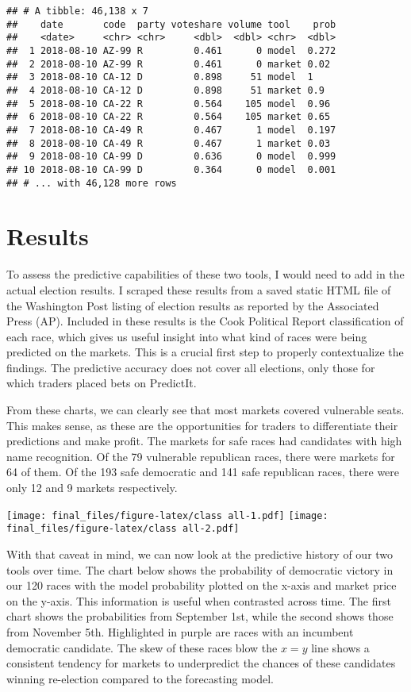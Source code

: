 \documentclass[]{article}
\begin{document}
\begin{verbatim}
## # A tibble: 46,138 x 7
##    date       code  party voteshare volume tool    prob
##    <date>     <chr> <chr>     <dbl>  <dbl> <chr>  <dbl>
##  1 2018-08-10 AZ-99 R         0.461      0 model  0.272
##  2 2018-08-10 AZ-99 R         0.461      0 market 0.02 
##  3 2018-08-10 CA-12 D         0.898     51 model  1    
##  4 2018-08-10 CA-12 D         0.898     51 market 0.9  
##  5 2018-08-10 CA-22 R         0.564    105 model  0.96 
##  6 2018-08-10 CA-22 R         0.564    105 market 0.65 
##  7 2018-08-10 CA-49 R         0.467      1 model  0.197
##  8 2018-08-10 CA-49 R         0.467      1 market 0.03 
##  9 2018-08-10 CA-99 D         0.636      0 model  0.999
## 10 2018-08-10 CA-99 D         0.364      0 model  0.001
## # ... with 46,128 more rows
\end{verbatim}

\section{Results}\label{results}

To assess the predictive capabilities of these two tools, I would need
to add in the actual election results. I scraped these results from a
saved static HTML file of the Washington Post listing of election
results as reported by the Associated Press (AP). Included in these
results is the Cook Political Report classification of each race, which
gives us useful insight into what kind of races were being predicted on
the markets. This is a crucial first step to properly contextualize the
findings. The predictive accuracy does not cover all elections, only
those for which traders placed bets on PredictIt.

From these charts, we can clearly see that most markets covered
vulnerable seats. This makes sense, as these are the opportunities for
traders to differentiate their predictions and make profit. The markets
for safe races had candidates with high name recognition. Of the 79
vulnerable republican races, there were markets for 64 of them. Of the
193 safe democratic and 141 safe republican races, there were only 12
and 9 markets respectively.

\texttt{[image: final\_files/figure-latex/class all-1.pdf]}
\texttt{[image: final\_files/figure-latex/class all-2.pdf]}

With that caveat in mind, we can now look at the predictive history of
our two tools over time. The chart below shows the probability of
democratic victory in our 120 races with the model probability plotted
on the x-axis and market price on the y-axis. This information is useful
when contrasted across time. The first chart shows the probabilities
from September 1st, while the second shows those from November 5th.
Highlighted in purple are races with an incumbent democratic candidate.
The skew of these races blow the \(x=y\) line shows a consistent
tendency for markets to underpredict the chances of these candidates
winning re-election compared to the forecasting model.
\end{document}
